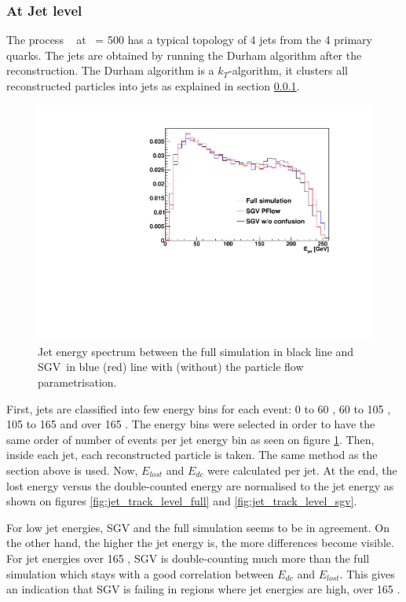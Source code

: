 \subsubsection{At Jet level}

The process \ee \ra\ \WWqqqq{} at \rts\ = 500 \GeV has a typical topology of 4 jets from the 4 primary quarks. The jets are obtained by running the Durham algorithm after the reconstruction. The Durham algorithm is a $k_T$-algorithm, it clusters all reconstructed particles into jets as explained in section \ref{}.

\begin{figure}[htbp!]
  \centering
  \includegraphics[width=1\linewidth]{Appendixes/fig_SGV/Jet_spectrum.pdf}
  \caption{Jet energy spectrum between the full simulation in black line and SGV in blue (red) line with (without) the particle flow parametrisation.}
  \label{fig:jet_spectrum}
\end{figure}

First, jets are classified into few energy bins for each event: 0 to 60 \GeV, 60 to 105 \GeV, 105 to 165 \GeV and over 165 \GeV. The energy bins were selected in order to have the same order of number of events per jet energy bin as seen on figure \ref{fig:jet_spectrum}. Then, inside each jet, each reconstructed particle is taken. The same method as the section above is used. Now, $E_{lost}$ and $E_{dc}$ were calculated per jet. At the end, the lost energy versus the double-counted energy are normalised to the jet energy as shown on figures \ref{fig:jet_track_level_full} and \ref{fig:jet_track_level_sgv}.

For low jet energies, SGV and the full simulation seems to be in agreement. On the other hand, the higher the jet energy is, the more differences become visible. For jet energies over 165 \GeV, SGV is double-counting much more than the full simulation which stays with a good correlation between $E_{dc}$ and $E_{lost}$. This gives an indication that SGV is failing in regions where jet energies are high, over 165 \GeV.

